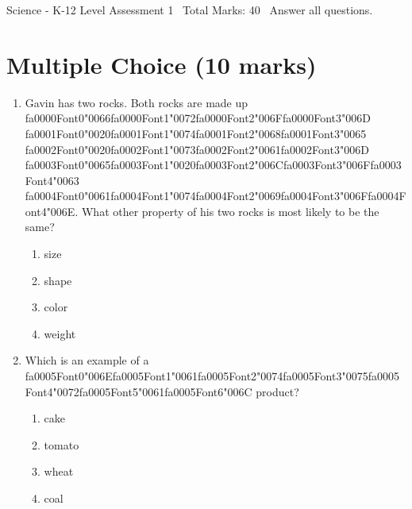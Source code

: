 \documentclass[12pt]{article}
\begin{document}
\begin{center}
Science - K-12 Level Assessment 1 \
Total Marks: 40 \
Answer all questions.
\end{center}

\section*{Multiple Choice (10 marks)}
\begin{enumerate}[label=\arabic*.]
\item Gavin has two rocks. Both rocks are made up {\csname fa0000Font0\endcsname\char"0066}{\csname fa0000Font1\endcsname\char"0072}{\csname fa0000Font2\endcsname\char"006F}{\csname fa0000Font3\endcsname\char"006D} {\csname fa0001Font0\endcsname\char"0020}{\csname fa0001Font1\endcsname\char"0074}{\csname fa0001Font2\endcsname\char"0068}{\csname fa0001Font3\endcsname\char"0065} {\csname fa0002Font0\endcsname\char"0020}{\csname fa0002Font1\endcsname\char"0073}{\csname fa0002Font2\endcsname\char"0061}{\csname fa0002Font3\endcsname\char"006D} {\csname fa0003Font0\endcsname\char"0065}{\csname fa0003Font1\endcsname\char"0020}{\csname fa0003Font2\endcsname\char"006C}{\csname fa0003Font3\endcsname\char"006F}{\csname fa0003Font4\endcsname\char"0063} {\csname fa0004Font0\endcsname\char"0061}{\csname fa0004Font1\endcsname\char"0074}{\csname fa0004Font2\endcsname\char"0069}{\csname fa0004Font3\endcsname\char"006F}{\csname fa0004Font4\endcsname\char"006E}. What other
property of his two rocks is most likely to be the same?
\begin{enumerate}[label=(\alph*)]
    \item size
    \item shape
    \item color
    \item weight
\end{enumerate}
\item Which is an example of a {\csname fa0005Font0\endcsname\char"006E}{\csname fa0005Font1\endcsname\char"0061}{\csname fa0005Font2\endcsname\char"0074}{\csname fa0005Font3\endcsname\char"0075}{\csname fa0005Font4\endcsname\char"0072}{\csname fa0005Font5\endcsname\char"0061}{\csname fa0005Font6\endcsname\char"006C} product?
\begin{enumerate}[label=(\alph*)]
    \item cake
    \item tomato
    \item wheat
    \item coal
\end{enumerate}

\end{enumerate}
\end{document}

